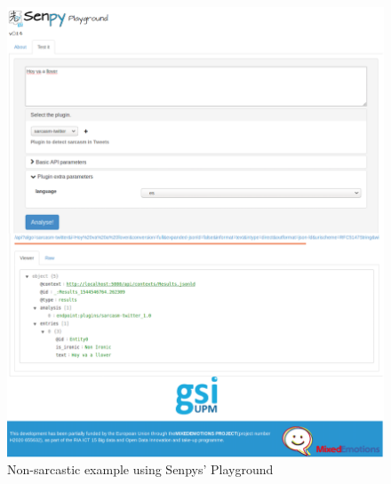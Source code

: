 \begin{figure}
	\includegraphics[width=\linewidth]{img/noironia.png}
	\caption{Non-sarcastic example using Senpys' Playground~\cite{senpy}}
	\label{fig:senpyex2}
\end{figure}

